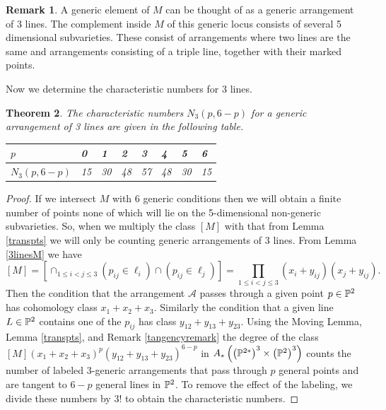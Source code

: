 \documentclass[12pt]{article}
\theoremstyle{plain}
\newtheorem{theorem}{Theorem}
\theoremstyle{definition}
\newtheorem{remark}[theorem]{Remark}
\newcommand{\A}{\mathcal{A}}
\newcommand{\N}{N}
\renewcommand{\P}{\ensuremath \mathbb{P}}
\begin{document}
\begin{remark} A generic element of $M$ can be thought of as a generic arrangement of 3 lines. The complement inside $M$ of this generic locus consists of several 5 dimensional subvarieties. These consist of arrangements where two lines are the same and arrangements consisting of a triple line, together with their marked points. \end{remark}

Now we determine the characteristic numbers for 3 lines.
 
\begin{theorem} \label{cn3}
The characteristic numbers $\N_3(p,6-p)$ for a generic arrangement
of 3 lines are given in the following table.

\begin{center}
\begin{tabular}{|l||l|l|l|l|l|l|l|}
\hline $p$ & 0 & 1 & 2 & 3 & 4 & 5 & 6  \\ \hline 

$\N_3(p,6-p)$ & 15 & 30 & 48 & 57 & 48 & 30 & 15 \\ \hline
\end{tabular}
\end{center}

\end{theorem}

\begin{proof}
If we intersect $M$ with 6 generic conditions then we will obtain a finite number of points none of which will lie on the 5-dimensional non-generic subvarieties. So, when we multiply the class $[M]$ with that from Lemma \ref{transpts} we will only be counting generic arrangements of 3 lines. From Lemma \ref{3linesM} we have $$[M] = [\cap_{1 \leq i < j \leq 3} (p_{ij} \in \ell_i) \cap (p_{ij}
\in \ell_j)] = \prod_{1 \leq i < j \leq 3} (x_i 
+ y_{ij})(x_j + y_{ij}).$$ Then the condition that the arrangement
$\A$ passes through a given point $p \in \P^2$ has cohomology class $x_1+x_2+x_3$. Similarly
the condition that a given line $L \in \P^2$ contains one of the
$p_{ij}$ has class $y_{12}+y_{13}+y_{23}$. Using the Moving Lemma, Lemma \ref{transpts}, and Remark \ref{tangencyremark} the degree of the class
$[M](x_1+x_2+x_3)^p(y_{12}+y_{13}+y_{23})^{6-p}$ in $A_*\left( \left(\P^{2*}\right)^3\times \left(\P^{2}\right)^3\right)$ counts the number of labeled 3-generic arrangements that pass
through $p$ general points and are tangent to $6-p$ general lines in
$\P^2$. To remove the effect of the labeling, we divide these numbers
by $3!$ to obtain the characteristic numbers. \end{proof}
\end{document}
